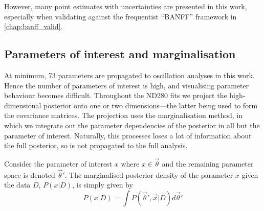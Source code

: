 However, many point estimates with uncertainties are presented in this work, especially when validating against the frequentist ``BANFF'' framework in \autoref{chap:banff_valid}.
 
\subsection{Parameters of interest and marginalisation}
At minimum, 73 parameters are propagated to oscillation analyses in this work. Hence the number of parameters of interest is high, and visualising parameter behaviour becomes difficult. Throughout the ND280 fits we project the high-dimensional posterior onto one or two dimensions---the latter being used to form the covariance matrices. The projection uses the marginalisation method, in which we integrate out the parameter dependencies of the posterior in all but the parameter of interest. Naturally, this processes loses a lot of information about the full posterior, so is not propagated to the full analysis.

Consider the parameter of interest $x$ where $x \in \vec{\theta}$ and the remaining parameter space is denoted $\vec{\theta}'$. The marginalised posterior density of the parameter $x$ given the data $D$, $P(x|D)$, is simply given by
\begin{equation}
P(x|D) = \int P(\vec{\theta}',\vec{x}|D) d\vec{\theta}'
\end{equation}


